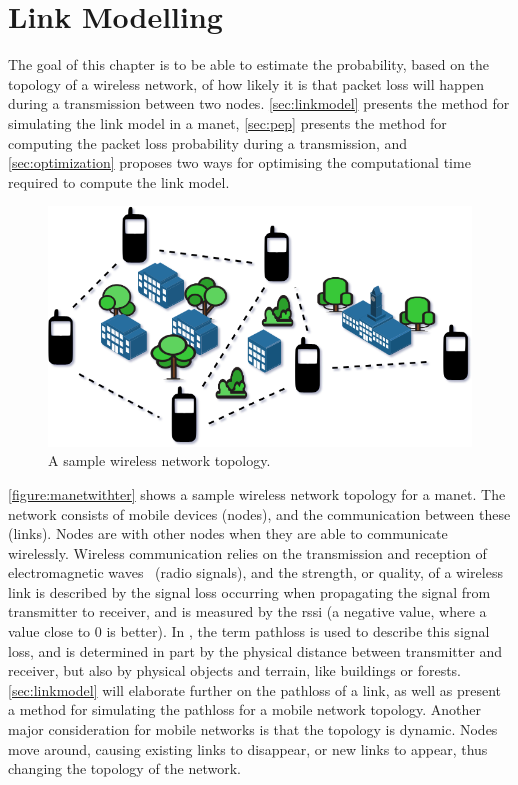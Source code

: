 \chapter{Link Modelling}\label{ch:linkmodel}
The goal of this chapter is to be able to estimate the probability, based on the topology of a wireless network, of how likely it is that packet loss will happen during a transmission between two nodes. \autoref{sec:linkmodel} presents the method for simulating the link model in a \gls{manet}, \autoref{sec:pep} presents the method for computing the packet loss probability during a transmission, and \autoref{sec:optimization} proposes two ways for optimising the computational time required to compute the link model.


\begin{figure}[ht]
    \centering
    \includegraphics[width=.7\textwidth]{figures/manet_with_terrain.png}
    \caption{A sample wireless network topology.}
    \label{figure:manetwithter}
\end{figure}

\autoref{figure:manetwithter} shows a sample wireless network topology for a \acrfull{manet}. The network consists of mobile devices (nodes), and the communication between these (links). Nodes are  with other nodes when they are able to communicate wirelessly. Wireless communication relies on the transmission and reception of electromagnetic waves~\cite[p.~10]{paper:linkmodel} (radio signals), and the strength, or quality, of a wireless link is described by the signal loss occurring when propagating the signal from transmitter to receiver, and is measured by the \gls{rssi} (a negative value, where a value close to 0 is better). In \cite{paper:linkmodel}, the term \gls{pathloss} is used to describe this signal loss, and is determined in part by the physical distance between transmitter and receiver, but also by physical objects and terrain, like buildings or forests. \autoref{sec:linkmodel} will elaborate further on the \gls{pathloss} of a link, as well as present a method for simulating the \gls{pathloss} for a mobile network topology. Another major consideration for mobile networks is that the topology is dynamic. Nodes move around, causing existing links to disappear, or new links to appear, thus changing the topology of the network.

